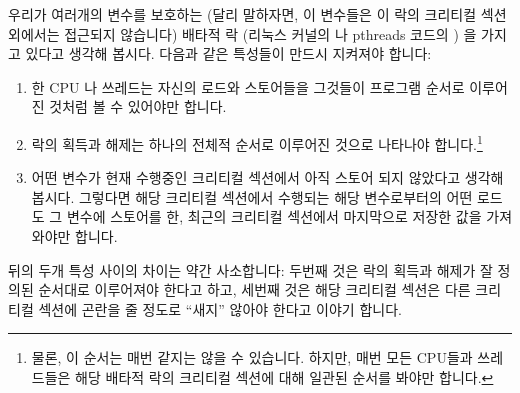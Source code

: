 우리가 여러개의 변수를 보호하는 (달리 말하자면, 이 변수들은 이 락의 크리티컬
섹션 외에서는 접근되지 않습니다) 배타적 락 (리눅스 커널의  나
pthreads 코드의 ) 을 가지고 있다고 생각해 봅시다.
다음과 같은 특성들이 만드시 지켜져야 합니다:
\begin{enumerate}
\item	한 CPU 나 쓰레드는 자신의 로드와 스토어들을 그것들이 프로그램 순서로
	이루어진 것처럼 볼 수 있어야만 합니다.
\item	락의 획득과 해제는 하나의 전체적 순서로 이루어진 것으로 나타나야
	합니다.\footnote{
		물론, 이 순서는 매번 같지는 않을 수 있습니다.
		하지만, 매번 모든 CPU들과 쓰레드들은 해당 배타적 락의 크리티컬
		섹션에 대해 일관된 순서를 봐야만 합니다.}
\item	어떤 변수가 현재 수행중인 크리티컬 섹션에서 아직 스토어 되지 않았다고
	생각해 봅시다.
	그렇다면 해당 크리티컬 섹션에서 수행되는 해당 변수로부터의 어떤 로드도
	그 변수에 스토어를 한, 최근의 크리티컬 섹션에서 마지막으로 저장한 값을
	가져와야만 합니다.
\end{enumerate}

뒤의 두개 특성 사이의 차이는 약간 사소합니다:
두번째 것은 락의 획득과 해제가 잘 정의된 순서대로 이루어져야 한다고 하고,
세번째 것은 해당 크리티컬 섹션은 다른 크리티컬 섹션에 곤란을 줄 정도로 ``새지''
않아야 한다고 이야기 합니다.

